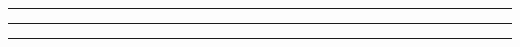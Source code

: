 \documentclass[10pt,landscape,a4paper]{article}
\begin{document}
\small
\begin{multicols*}{4}
	
\setcounter{section}{0}
 \hrule
 \hrule
 \hrule

\end{multicols*}
\end{document}
